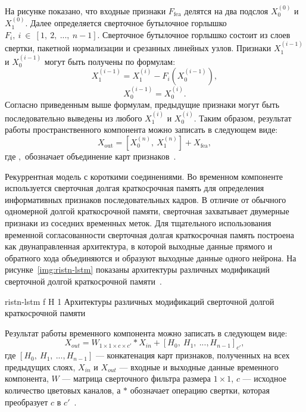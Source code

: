 \documentclass{bmstu}
\begin{document}
На рисунке показано, что входные признаки $F_{\text{fea}}$ делятся на два подслоя $X^{(0)}_{0}$ и $X^{(0)}_{1}$. 
Далее определяется сверточное бутылочное горлышко $F_i,~i~\in~[1,~2,~...,~n - 1]$. 
Сверточное бутылочное горлышко состоит из слоев свертки, пакетной нормализации и срезанных линейных узлов. 
Признаки $X^{(i - 1)}_{1}$ и $X^{(i - 1)}_{0}$ могут быть получены по формулам:
\begin{equation}
X^{(i - 1)}_{1} = X^{(i)}_{1} - F_{i}(X^{(i - 1)}_{0}),
\end{equation}
\begin{equation}
X^{(i - 1)}_{0} = X^{(i)}_{0}.
\end{equation}
Согласно приведенным выше формулам, предыдущие признаки могут быть последовательно выведены из любого $X^{(i)}_{1}$ и $X^{(i)}_{0}$. 
Таким образом, результат работы пространственного компонента можно записать в следующем виде:
\begin{equation}
X_{\text{out}} = [X^{(n)}_{0},~X^{(n)}_{1}] + X_{\text{fea}},
\end{equation}
где $,$ обозначает объединение карт признаков~\cite{Xiaobin2019}.

Рекуррентная модель с короткими соединениями. 
Во временном компоненте используется сверточная долгая краткосрочная память для определения информативных признаков последовательных кадров. 
В отличие от обычного одномерной долгой краткосрочной памяти, сверточная захватывает двумерные признаки из соседних временных меток. 
Для тщательного использования временной согласованности сверточная долгая краткосрочная память построена как двунаправленная архитектура, в которой выходные данные прямого и обратного хода объединяются и образуют выходные данные одного нейрона. 
На рисунке~\ref{img:ristn-lstm} показаны архитектуры различных модификаций сверточной долгой краткосрочной памяти~\cite{Xiaobin2019}.

    {ristn-lstm}
    {f}
    {H}
    {1\textwidth}
    {Архитектуры различных модификаций сверточной долгой краткосрочной памяти~\cite{Xiaobin2019}}
    
Результат работы временного компонента можно записать в следующем виде:
\begin{equation}
X_{out} = W_{1 \times 1 \times c \times c'} * X_{in} + [H_0,~H_1,~...,H_{n - 1}]_{c'},
\end{equation}
где $[H_0,~H_1,~...,H_{n - 1}]$ --- конкатенация карт признаков, полученных на всех предыдущих слоях, $X_{in}$ и $X_{out}$ --- входные и выходные данные временного компонента, $W$ --- матрица сверточного фильтра размера $1 \times 1$, $c$ --- исходное количество цветовых каналов, а $*$ обозначает операцию свертки, которая преобразует $c$ в $c'$~\cite{Xiaobin2019}.
\end{document}
